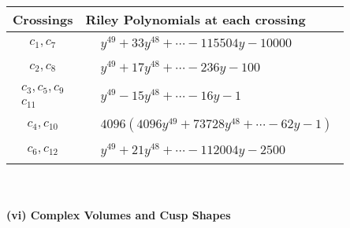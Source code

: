 \documentclass[1p]{elsarticle_modified}
\theoremstyle{definition}
\begin{document}
\begin{tabular}{m{50pt}|m{274pt}}
Crossings & \hspace{64pt}Riley Polynomials at each crossing \\
\hline $$\begin{aligned}c_{1},c_{7}\end{aligned}$$&$\begin{aligned}
&y^{49}+33 y^{48}+\cdots-115504 y-10000
\end{aligned}$\\
\hline $$\begin{aligned}c_{2},c_{8}\end{aligned}$$&$\begin{aligned}
&y^{49}+17 y^{48}+\cdots-236 y-100
\end{aligned}$\\
\hline $$\begin{aligned}c_{3},c_{5},c_{9}\\c_{11}\end{aligned}$$&$\begin{aligned}
&y^{49}-15 y^{48}+\cdots-16 y-1
\end{aligned}$\\
\hline $$\begin{aligned}c_{4},c_{10}\end{aligned}$$&$\begin{aligned}
&4096(4096 y^{49}+73728 y^{48}+\cdots-62 y-1)
\end{aligned}$\\
\hline $$\begin{aligned}c_{6},c_{12}\end{aligned}$$&$\begin{aligned}
&y^{49}+21 y^{48}+\cdots-112004 y-2500
\end{aligned}$\\
\hline
\end{tabular}\\~\\
\newpage\flushleft \textbf{(vi) Complex Volumes and Cusp Shapes}
\end{document}
